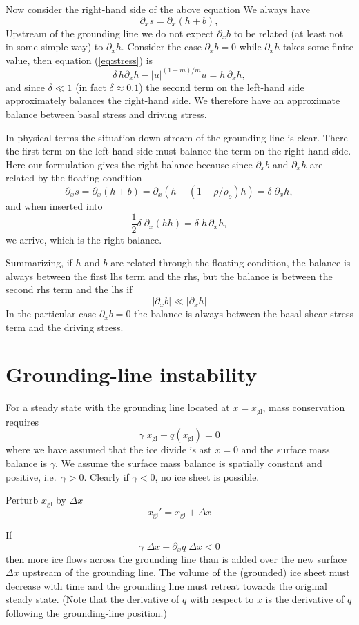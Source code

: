 \documentclass[10pt,a4paper]{book}
\newcommand{\p}{\partial}
\newcommand{\xgl}{x_{\mathrm{gl}}}
\begin{document}
Now consider the right-hand side of the above equation
We always have
\[ 
\p_x s= \p_x (h+b) ,
\]
Upstream of the grounding line we do not expect $\p_x b$ to be related
(at least not in some simple way) to $\p_x h$. Consider the case
$\p_x b=0$ while $\p_x h$ takes some finite value, then
equation (\ref{eq:stress}) is
\begin{equation}
\delta \, h \p_x h  - |u|^{(1-m)/m} u  = h \, \p_x h  ,
\label{eq:sc4}
\end{equation}
and since $\delta \ll 1$ (in fact $\delta \approx 0.1$) the second
term on the left-hand side approximately balances the right-hand
side. We therefore have an approximate balance between basal stress
and driving stress.

In physical terms the situation down-stream of the grounding line is clear. There the
first term on the left-hand side must balance the term on the right
hand side. Here our formulation gives the right balance because since  $\p_x
b$ and $\p_x h$ are related by the floating condition
\[
\p_x s= \p_x(h+b)=\p_x (h-(1-\rho/\rho_o) h)=\delta \; \p_x h ,
\]
and when inserted into 
\begin{equation}
 \frac{1}{2} \delta \; \p_x \left (h h \right )  = \delta \; h \, \p_x h  ,
\label{eq:sc40}
\end{equation}
we arrive, which is the right balance.

Summarizing, if $h$ and $b$ are related
through the floating condition, the balance is always between the
first lhs term and the rhs, but  the balance is between the second rhs
term and the lhs if
\[
|\p_x b| \ll |\p_x h|
\] 
In the particular case $\p_x b=0$ the balance is always
between the basal shear stress term and the driving stress.


\section{Grounding-line instability}

For a steady state with the grounding line located at $x=\xgl$, mass
conservation requires
\[
\gamma \; \xgl + q(\xgl)=0
\]
where we have assumed that the ice divide is ast $x=0$ and the surface
mass balance is $\gamma$. We assume the surface mass balance is spatially constant and
positive, i.e.\ $\gamma > 0$. Clearly if $\gamma<0$, no ice sheet is possible. 

Perturb $\xgl$ by $\Delta x$
\[
  \xgl'=\xgl + \Delta x
\]

If
\[
\gamma \; \Delta x - \p_x q \; \Delta x < 0
\]
then more ice flows across the grounding line than is added over the
new surface $\Delta x$ upstream of the grounding line. The volume of
the (grounded) ice sheet must decrease with time and the grounding
line must retreat towards the original steady state. (Note that the
derivative of $q$ with respect to $x$ is the derivative of $q$
following the grounding-line position.)
\end{document}
